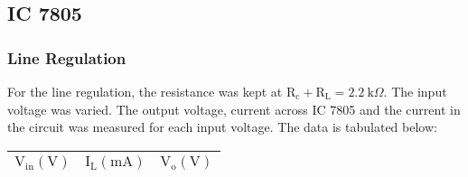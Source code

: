 \documentclass[12pt]{article}
\begin{document}
\subsection{IC 7805}
\subsubsection{Line Regulation}
For the line regulation, the resistance was kept at $\mathrm{R_c+R_L}=2.2 \ \mathrm{k}\Omega$. The input voltage was varied. The output voltage, current across IC 7805 and the current in the circuit was measured for each input voltage. The data is tabulated below:
\begin{longtable}{|c|c|c|}
        \hline
       {$\mathrm{V_{in} (V)}$} & $\mathrm{I_L (mA)}$ & $\mathrm{V_o (V)}$ \\ \hline \hline
    
        
    
        

\end{longtable}
\end{document}
